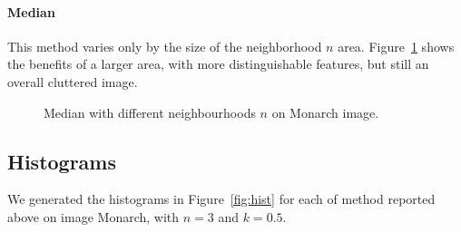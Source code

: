 \documentclass[conference]{IEEEtran}
\begin{document}
\paragraph*{Median} This method varies only by the size of the neighborhood $n$ area. Figure~\ref{fig:median_monarch} shows the benefits of a larger area, with more distinguishable features, but still an overall cluttered image.
\begin{figure}[htbp]
	\centering
	\quad
	\caption{Median with different neighbourhoods $n$ on Monarch image.}
	\label{fig:median_monarch}
\end{figure}
\subsection{Histograms}
\label{sec:hist}
We generated the histograms in Figure~\ref{fig:hist} for each of method reported above on image Monarch, with $n = 3$ and $k = 0.5$.
\end{document}
